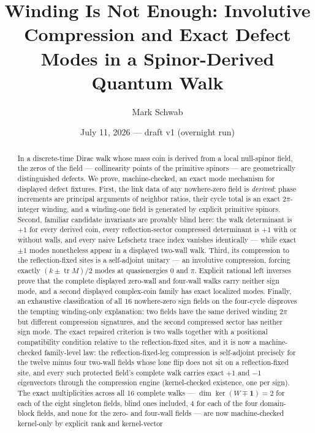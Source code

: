 \documentclass[11pt]{article}
\title{Winding Is Not Enough: Involutive Compression and Exact Defect
Modes in a Spinor-Derived Quantum Walk}
\author{Mark Schwab}
\date{July 11, 2026 --- draft v1 (overnight run)}
\newcommand{\id}{\mathbf{1}}
\newcommand{\tr}{\operatorname{tr}}
\begin{document}
\maketitle

\begin{abstract}
In a discrete-time Dirac walk whose mass coin is derived from a local
null-spinor field, the zeros of the field --- collinearity points of the
primitive spinors --- are geometrically distinguished defects.  We prove,
machine-checked, an exact mode mechanism for displayed defect fixtures.
First, the link data of any nowhere-zero field is \emph{derived}: phase
increments are principal arguments of neighbor ratios, their cycle total is
an exact $2\pi$-integer winding, and a winding-one field is generated by
explicit primitive spinors.  Second, familiar candidate invariants are
provably blind here: the walk determinant is $+1$ for every derived coin,
every reflection-sector compressed determinant is $+1$ with or without
walls, and every naive Lefschetz trace index vanishes identically ---
while exact $\pm1$ modes nonetheless appear in a displayed two-wall walk.
Third, its compression to the reflection-fixed sites is a self-adjoint
unitary --- an involutive compression, forcing exactly
$(k\pm\tr M)/2$ modes at quasienergies $0$ and $\pi$.  Explicit rational
left inverses prove that the complete displayed zero-wall and four-wall
walks carry neither sign mode, and a second displayed complex-coin family
has exact localized modes.  Finally, an exhaustive classification of all
16 nowhere-zero sign fields on the four-cycle disproves the tempting
winding-only explanation: two fields have the same derived winding $2\pi$
but different compression signatures, and the second compressed sector has
neither sign mode.  The exact repaired criterion is two walls together with
a positional compatibility condition relative to the reflection-fixed
sites, and it is now a machine-checked family-level law: the
reflection-fixed-leg compression is self-adjoint precisely for the twelve
minus four two-wall fields whose lone flip does not sit on a
reflection-fixed site, and every such protected field's complete walk
carries exact $+1$ and $-1$ eigenvectors through the compression engine
(kernel-checked existence, one per sign).  The exact multiplicities
across all 16 complete walks --- $\dim\ker(W\mp\id)=2$ for each of the
eight singleton fields, blind ones included, $4$ for each of the four
domain-block fields, and none for the zero- and four-wall fields --- are
now machine-checked kernel-only by explicit rank and kernel-vector

\end{abstract}
\end{document}
